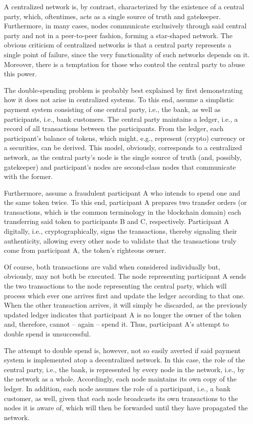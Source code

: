 A centralized network is, by contrast, characterized by the existence of a central party, which, oftentimes, acts as a single source of truth and gatekeeper.
Furthermore, in many cases, nodes communicate exclusively through said central party and not in a peer-to-peer fashion, forming a star-shaped network.
The obvious criticism of centralized networks is that a central party represents a single point of failure, since the very functionality of such networks depends on it.
Moreover, there is a temptation for those who control the central party to abuse this power.

The double-spending problem is probably best explained by first demonstrating how it does not arise in centralized systems.
To this end, assume a simplistic payment system consisting of one central party, i.e., the bank, as well as participants, i.e., bank customers.
The central party maintains a ledger, i.e., a record of all transactions between the participants.
From the ledger, each participant's balance of tokens, which might, e.g., represent (crypto) currency or a securities, can be derived.
This model, obviously, corresponds to a centralized network, as the central party's node is the single source of truth (and, possibly, gatekeeper) and participant's nodes are second-class nodes that communicate with the former.

Furthermore, assume a fraudulent participant A who intends to spend one and the same token twice.
To this end, participant A prepares two transfer orders (or transactions, which is the common terminology in the blockchain domain) each transferring said token to participants B and C, respectively.
Participant A digitally, i.e., cryptographically, signs the transactions, thereby signaling their authenticity, allowing every other node to validate that the transactions truly come from participant A, the token's righteous owner.

Of course, both transactions are valid when considered individually but, obviously, may not both be executed.
The node representing participant A sends the two transactions to the node representing the central party, which will process which ever one arrives first and update the ledger according to that one.
When the other transaction arrives, it will simply be discarded, as the previously updated ledger indicates that participant A is no longer the owner of the token and, therefore, cannot -- again -- spend it.
Thus, participant A's attempt to double spend is unsuccessful.

The attempt to double spend is, however, not so easily averted if said payment system is implemented atop a decentralized network.
In this case, the role of the central party, i.e., the bank, is represented by every node in the network, i.e., by the network as a whole.
Accordingly, each node maintains its own copy of the ledger.
In addition, each node assumes the role of a participant, i.e., a bank customer, as well, given that each node broadcasts its own transactions to the nodes it is aware of, which will then be forwarded until they have propagated the network.

